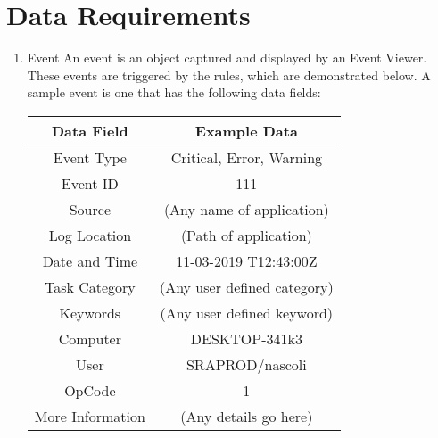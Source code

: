 \documentclass{scrreprt}
\begin{document}
\section{Data Requirements}

\begin{enumerate}[label*=D\arabic*.]
    \item Event
	\subitem An event is an object captured and displayed by an Event Viewer. These events are triggered by the rules, which are demonstrated below. A sample event is one that has the following data fields:
	     \subitem
	\begin{tabular}{|c|c|}
        \hline
         \textbf{Data Field} & \textbf{Example Data}\\
        \hline
         Event Type & Critical, Error, Warning \\
        \hline
        Event ID & 111\\
        \hline
	Source & (Any name of application) \\ 
        \hline
	Log Location & (Path of application) \\
        \hline
	Date and Time &  11-03-2019 T12:43:00Z\\
	\hline
	Task Category & (Any user defined category)\\
	\hline
	Keywords & (Any user defined keyword)\\
	\hline
	Computer & DESKTOP-341k3\\
	\hline
	User & SRAPROD/nascoli\\
	\hline
	OpCode & 1\\
	\hline
	More Information & (Any details go here)\\
	\hline

      \end{tabular}
\end{enumerate}
\end{document}
